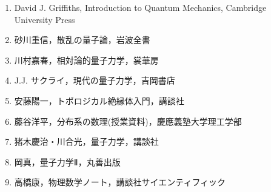 \documentclass{report}
\begin{document}
  \begin{enumerate}
    \item David J. Griffiths, Introduction to Quantum Mechanics, Cambridge University Press
    \item 砂川重信，散乱の量子論，岩波全書
    \item 川村嘉春，相対論的量子力学，裳華房
    \item J.J. サクライ，現代の量子力学，吉岡書店
    \item 安藤陽一，トポロジカル絶縁体入門，講談社
    \item 藤谷洋平，分布系の数理(授業資料)，慶應義塾大学理工学部
    \item 猪木慶治・川合光，量子力学，講談社
    \item 岡真，量子力学Ⅱ，丸善出版
    \item 高橋康，物理数学ノート，講談社サイエンティフィック
  \end{enumerate}
\end{document}

